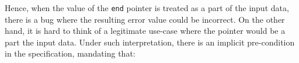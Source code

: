 \documentclass[acmsmall,nonacm]{acmart}
\begin{document}









     
     
     

     
     
     


    
    




   



    

Hence, when the value of the \texttt{end} pointer is treated as a part of the input data, there is a bug where the resulting error value could be incorrect. On the other hand, it is hard to think of a legitimate use-case where the pointer would be a part the input data. Under such interpretation, there is an implicit pre-condition in the specification, mandating that:
\end{document}
